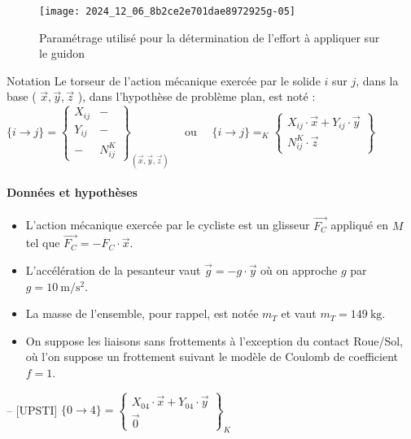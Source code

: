 \begin{figure}[!htb]
\begin{center}
\texttt{[image: 2024\_12\_06\_8b2ce2e701dae8972925g-05]}
\caption{Paramétrage utilisé pour la détermination de l'effort à appliquer sur le guidon \label{fig_25}}
\end{center}
\end{figure}


Notation Le torseur de l'action mécanique exercée par le solide \(i\) sur \(j\), dans la base ( \(\vec{x}, \vec{y}, \vec{z}\) ), dans l'hypothèse de problème plan, est noté :
$
\{i \rightarrow j\}=\left\{\begin{array}{c|c}
X_{i j} & - \\
Y_{i j} & - \\
- & N_{i j}^{K}
\end{array}\right\}_{(\vec{x}, \vec{y}, \vec{z})} \quad \text { ou } \quad\{i \rightarrow j\}=_{K}\left\{\begin{array}{c}
X_{i j} \cdot \vec{x}+Y_{i j} \cdot \vec{y} \\
N_{i j}^{K} \cdot \vec{z}
\end{array}\right\}
$

\paragraph*{Données et hypothèses}
\begin{itemize}
  \item L'action mécanique exercée par le cycliste est un glisseur \(\overrightarrow{F_{C}}\) appliqué en \(M\) tel que \(\overrightarrow{F_{C}}=-F_{C} \cdot \vec{x}\).
  \item L'accélération de la pesanteur vaut \(\vec{g}=-g \cdot \vec{y}\) où on approche \(g\) par \(g=10 \mathrm{~m} / \mathrm{s}^{2}\).
  \item La masse de l'ensemble, pour rappel, est notée \(m_{T}\) et vaut \(m_{T}=149 \mathrm{~kg}\).
  \item On suppose les liaisons sans frottements à l'exception du contact Roue/Sol, où l'on suppose un frottement suivant le modèle de Coulomb de coefficient \(f=1\).
\end{itemize}
\fi

\ifprof
\begin{corrige}-- [UPSTI]
$\{0 \rightarrow 4\}=\left\{\begin{array}{c}
X_{04} \cdot \vec{x}+Y_{04} \cdot \vec{y} \\
\vec{0}
\end{array}\right\}_{K}
$
\end{corrige}
\else
\fi

